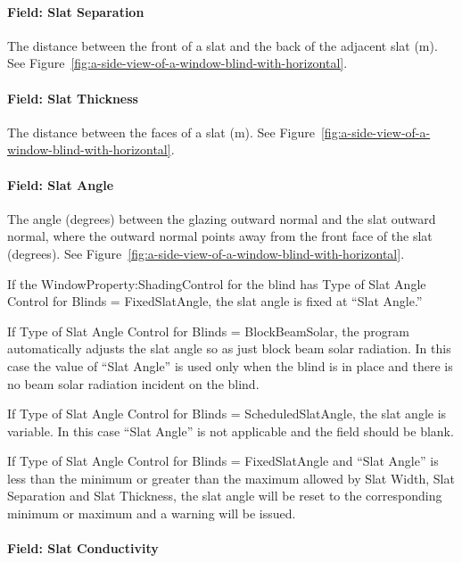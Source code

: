 \paragraph{Field: Slat Separation}\label{field-slat-separation}

The distance between the front of a slat and the back of the adjacent slat (m). See Figure~\ref{fig:a-side-view-of-a-window-blind-with-horizontal}.

\paragraph{Field: Slat Thickness}\label{field-slat-thickness}

The distance between the faces of a slat (m). See Figure~\ref{fig:a-side-view-of-a-window-blind-with-horizontal}.

\paragraph{Field: Slat Angle}\label{field-slat-angle}

The angle (degrees) between the glazing outward normal and the slat outward normal, where the outward normal points away from the front face of the slat (degrees). See Figure~\ref{fig:a-side-view-of-a-window-blind-with-horizontal}.

If the WindowProperty:ShadingControl for the blind has Type of Slat Angle Control for Blinds = FixedSlatAngle, the slat angle is fixed at ``Slat Angle.''

If Type of Slat Angle Control for Blinds = BlockBeamSolar, the program automatically adjusts the slat angle so as just block beam solar radiation. In this case the value of ``Slat Angle'' is used only when the blind is in place and there is no beam solar radiation incident on the blind.

If Type of Slat Angle Control for Blinds = ScheduledSlatAngle, the slat angle is variable. In this case ``Slat Angle'' is not applicable and the field should be blank.

If Type of Slat Angle Control for Blinds = FixedSlatAngle and ``Slat Angle'' is less than the minimum or greater than the maximum allowed by Slat Width, Slat Separation and Slat Thickness, the slat angle will be reset to the corresponding minimum or maximum and a warning will be issued.

\paragraph{Field: Slat Conductivity}\label{field-slat-conductivity}

